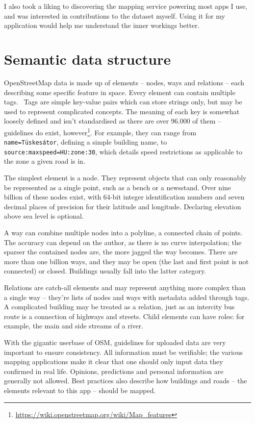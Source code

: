 I also took a liking to discovering the mapping service powering most apps I use, and was interested in contributions to the dataset myself. Using it for my application would help me understand the inner workings better.

\section{Semantic data structure}

OpenStreetMap data is made up of elements -- nodes, ways and relations -- each describing some specific feature in space. Every element can contain multiple tags.~\cite{osmElements} Tags are simple key-value pairs which can store strings only, but may be used to represent complicated concepts. The meaning of each key is somewhat loosely defined and isn't standardised as there are over 96.000 of them -- guidelines do exist, however\footnote{\url{https://wiki.openstreetmap.org/wiki/Map_features}}. For example, they can range from \verb|name=Tüskesátor|, defining a simple building name, to \verb|source:maxspeed=HU:zone:30|, which details speed restrictions as applicable to the zone a given road is in.

The simplest element is a node. They represent objects that can only reasonably be represented as a single point, such as a bench or a newsstand. Over nine billion of these nodes exist, with 64-bit integer identification numbers and seven decimal places of precision for their latitude and longitude. Declaring elevation above sea level is optional.

A way can combine multiple nodes into a polyline, a connected chain of points. The accuracy can depend on the author, as there is no curve interpolation; the sparser the contained nodes are, the more jagged the way becomes. There are more than one billion ways, and they may be open (the last and first point is not connected) or closed. Buildings usually fall into the latter category.

Relations are catch-all elements and may represent anything more complex than a single way -- they're lists of nodes and ways with metadata added through tags. A complicated building may be treated as a relation, just as an intercity bus route is a connection of highways and streets. Child elements can have roles: for example, the main and side streams of a river.

With the gigantic userbase of OSM, guidelines for uploaded data are very important to ensure consistency. All information must be verifiable; the various mapping applications make it clear that one should only input data they confirmed in real life. Opinions, predictions and personal information are generally not allowed. Best practices also describe how buildings and roads -- the elements relevant to this app -- should be mapped.\cite{osmGoodPractices}

